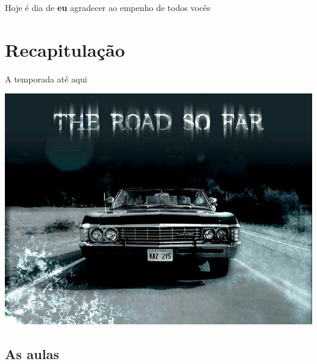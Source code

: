 \documentclass{beamer}
\begin{document}
\begin{frame}{\scriptsize }
  \begin{center}
    Hoje é dia de {\bf eu} agradecer ao empenho de todos vocês
  \end{center}
\end{frame}

\section{Recapitulação}

\begin{frame}{\scriptsize A temporada até aqui}
  \begin{center}
    \includegraphics[width=\textwidth]{Encerramento/theroadsofar}
  \end{center}
\end{frame}

\subsection{As aulas}
\end{document}
